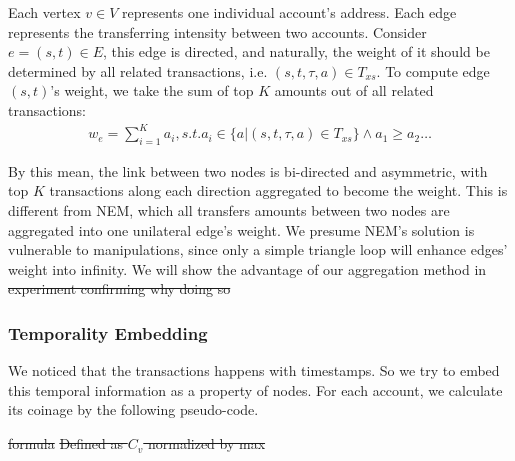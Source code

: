 Each vertex $v \in V$ represents one individual account's address. Each edge represents the transferring intensity between two accounts. Consider $e=(s,t) \in E$, this edge is directed, and naturally, the weight of it should be determined by all related transactions, i.e. $(s,t,\tau, a) \in T_{xs}$. To compute edge $(s,t)$'s weight, we take the sum of top $K$ amounts out of all related transactions:
\begin{align}
w_e = \sum_{i=1}^K a_i, s.t. a_i \in \{a|(s,t,\tau,a) \in T_{xs} \} \land a_1 \geq a_2 \dots
\end{align}

By this mean, the link between two nodes is bi-directed and asymmetric, with top $K$ transactions along each direction aggregated to become the weight. This is different from NEM, which all transfers amounts between two nodes are aggregated into one unilateral edge's weight\cite{nem}. We presume NEM's solution is vulnerable to manipulations, since only a simple triangle loop will enhance edges' weight into infinity. We will show the advantage of our aggregation method in  \st{experiment confirming why doing so}

\subsubsection{Temporality Embedding} \label{subsec:coinage}
We noticed that the transactions happens with timestamps. So we try to embed this temporal information as a property of nodes. For each account, we calculate its coinage by the following pseudo-code.

\st{formula} \st{Defined as $C_v$ normalized by max}

